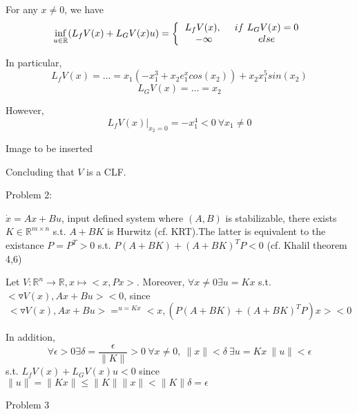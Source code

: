 For any $x \neq 0$, we have 
\begin{equation*}
\inf_{u \in \mathbb{R}}(L_fV(x) + L_GV(x)u) = 
\left \{ 
\begin{tabular}{cc} 
$L_fV(x), \ $ & $if\ L_GV(x) = 0$ \\ 
$- \infty$ & $else$ 
\end{tabular} 
\right.
\end{equation*}

In particular,
\begin{equation*}
L_fV(x) = \dots = x_1(-x_1^3 + x_2e^x_1 cos(x_2)) + x_2x_1^5sin(x_2)
\end{equation*}
\begin{equation*}
L_GV(x) = \dots = x_2
\end{equation*}

However, 
\begin{equation*}
L_fV(x)|_{x_2 = 0} = -x_1^4 < 0 \ \forall x_1 \neq 0
\end{equation*}

Image to be inserted

Concluding that $V$ is a CLF.

Problem 2:

$\dot{x} = Ax + Bu$, input defined system where $(A,B)$ is stabilizable, there exists $K \in \mathbb{R}^{m \times n}$ s.t. $A+BK$ is Hurwitz (cf. KRT).The latter is equivalent to the existance $P = P^T > 0$ s.t. $P(A+BK) + (A+BK)^TP < 0$ (cf. Khalil theorem 4,6)

Let $V: \mathbb{R}^n \to \mathbb{R}, x \mapsto <x, Px>$. Moreover, $\forall x \neq 0 \exists u = Kx$ s.t. $<\triangledown V(x), Ax+Bu> < 0$, since 
\begin{equation*}
<\triangledown V(x), Ax+Bu> =^{u = Kx} <x, (P(A+BK)+ (A+BK)^TP)x> < 0
\end{equation*} 

In addition,
\begin{equation*}
\forall \epsilon > 0 \exists \delta = \frac{\epsilon}{\|K\| } > 0 \ \forall x \neq 0, \ \|x\| < \delta \ \exists u = Kx \ \|u\| < \epsilon 
\end{equation*}
s.t. $L_fV(x) + L_GV(x)u < 0$ since $\|u\| = \|Kx\| \leq \|K\|\|x\| < \|K\|\delta = \epsilon$

Problem 3

